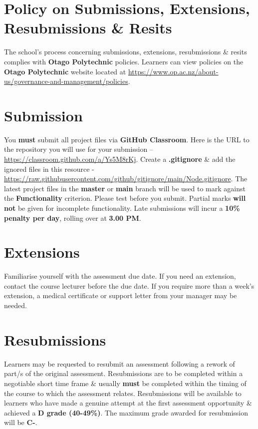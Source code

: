 \documentclass{article}
\begin{document}
\section*{Policy on Submissions, Extensions, Resubmissions \& Resits}
The school's process concerning submissions, extensions, resubmissions \& resits complies with \textbf{Otago Polytechnic} policies. Learners can view policies on the \textbf{Otago Polytechnic} website located at \href{https://www.op.ac.nz/about-us/governance-and-management/policies}{https://www.op.ac.nz/about-us/governance-and-management/policies}.

\section*{Submission}
You \textbf{must} submit all project files via \textbf{GitHub Classroom}. Here is the URL to the repository you will use for your submission – \href{https://classroom.github.com/a/Ys5M8rKj}{https://classroom.github.com/a/Ys5M8rKj}.  Create a \textbf{.gitignore} \& add the ignored files in this resource - \href{https://raw.githubusercontent.com/github/gitignore/main/Node.gitignore}{https://raw.githubusercontent.com/github/gitignore/main/Node.gitignore}. The latest project files in the \textbf{master} or \textbf{main} branch will be used to mark against the \textbf{Functionality} criterion. Please test before you submit. Partial marks \textbf{will not} be given for incomplete functionality. Late submissions will incur a \textbf{10\% penalty per day}, rolling over at \textbf{3.00 PM}.

\section*{Extensions}
Familiarise yourself with the assessment due date. If you need an extension, contact the course lecturer before the due date. If you require more than a week's extension, a medical certificate or support letter from your manager may be needed.

\section*{Resubmissions}
Learners may be requested to resubmit an assessment following a rework of part/s of the original assessment. Resubmissions are to be completed within a negotiable short time frame \& usually \textbf{must} be completed within the timing of the course to which the assessment relates. Resubmissions will be available to learners who have made a genuine attempt at the first assessment opportunity \& achieved a \textbf{D grade (40-49\%)}. The maximum grade awarded for resubmission will be \textbf{C-}.
\end{document}
